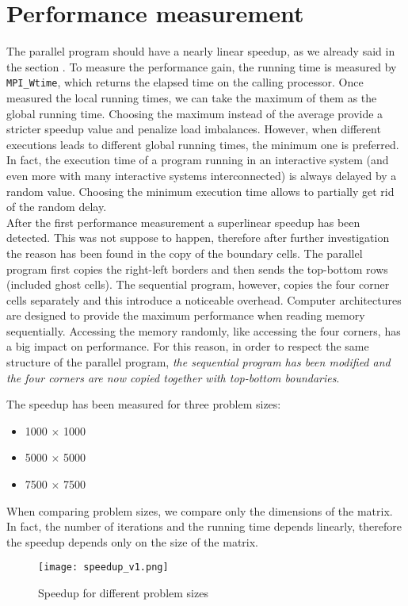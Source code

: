 \documentclass{article}
\begin{document}
\section{Performance measurement}
The parallel program should have a nearly linear speedup, as we already said in the section . To measure the performance gain, the running time is measured by \texttt{MPI\_Wtime}, which returns the elapsed time on the calling processor. Once measured the local running times, we can take the maximum of them as the global running time. Choosing the maximum instead of the average provide a stricter speedup value and penalize load imbalances. However, when different executions leads to different global running times, the minimum one is preferred. In fact, the execution time of a program running in an interactive system (and even more with many interactive systems interconnected) is always delayed by a random value. Choosing the minimum execution time allows to partially get rid of the random delay. \\
After the first performance measurement a superlinear speedup has been detected. This was not suppose to happen, therefore after further investigation the reason has been found in the copy of the boundary cells. The parallel program first copies the right-left borders and then sends the top-bottom rows (included ghost cells). The sequential program, however, copies the four corner cells separately and this introduce a noticeable overhead. Computer architectures are designed to provide the maximum performance when reading memory sequentially. Accessing the memory randomly, like accessing the four corners, has a big impact on performance. For this reason, in order to respect the same structure of the parallel program, \emph{the sequential program has been modified and the four corners are now copied together with top-bottom boundaries}.

The speedup has been measured for three problem sizes:
\begin{itemize}
    \item 1000 $\times$ 1000
    \item 5000 $\times$ 5000
    \item 7500 $\times$ 7500
\end{itemize}
When comparing problem sizes, we compare only the dimensions of the matrix. In fact, the number of iterations and the running time depends linearly, therefore the speedup depends only on the size of the matrix.

\begin{figure}
\centering
\texttt{[image: speedup\_v1.png]}
\caption{Speedup for different problem sizes}
\label{fig:speedupcomparison}
\end{figure}
\end{document}
